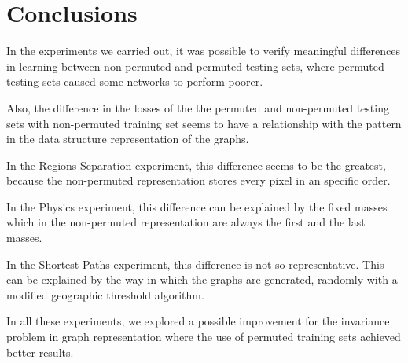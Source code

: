 \section{Conclusions}

In the experiments we carried out, it was possible to verify meaningful differences in learning between non-permuted and permuted testing sets, where permuted testing sets caused some networks to perform poorer.

Also, the difference in the losses of the the permuted and non-permuted testing sets with non-permuted training set seems to have a relationship with the pattern in the data structure representation of the graphs. 

In the Regions Separation experiment, this difference seems to be the greatest, because the non-permuted representation stores every pixel in an specific order.

In the Physics experiment, this difference can be explained by the fixed masses which in the non-permuted representation are always the first and the last masses.

In the Shortest Paths experiment, this difference is not so representative. This can be explained by the way in which the graphs are generated, randomly with a modified geographic threshold algorithm.

In all these experiments, we explored a possible improvement for the invariance problem in graph representation where the use of permuted training sets achieved better results.